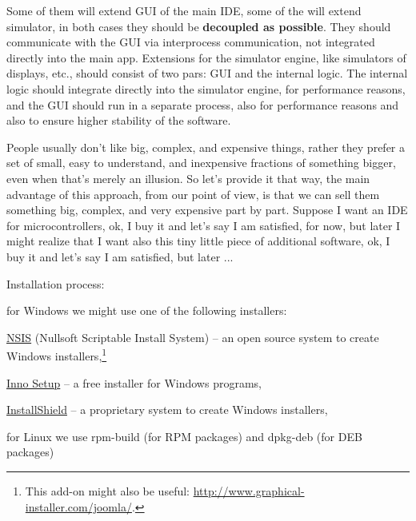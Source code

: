 \documentclass[a4paper,twoside,15pt]{book}
\begin{document}
\begin{dinglist}{73}
\begin{dinglist}{75}
						\item Some of them will extend GUI of the main IDE, some of the will extend simulator, in both cases they should be \textbf{decoupled as possible}. They should communicate with the GUI via interprocess communication, not integrated directly into the main app. Extensions for the simulator engine, like simulators of displays, etc., should consist of two pars: GUI and the internal logic. The internal logic should integrate directly into the simulator engine, for performance reasons, and the GUI should run in a separate process, also for performance reasons and also to ensure higher stability of the software.
						\item People usually don't like big, complex, and expensive things, rather they prefer a set of small, easy to understand, and inexpensive fractions of something bigger, even when that's merely an illusion. So let's provide it that way, the main advantage of this approach, from our point of view, is that we can sell them something big, complex, and very expensive part by part. Suppose I want an IDE for microcontrollers, ok, I buy it and let's say I am satisfied, for now, but later I might realize that I want also this tiny little piece of additional software, ok, I buy it and let's say I am satisfied, but later ...
					\end{dinglist}
				\item Installation process:
					\begin{dinglist}{75}
						\item for Windows we might use one of the following installers:
							\begin{dinglist}{72}
								\item \href{http://nsis.sourceforge.net/Main_Page}{NSIS} (Nullsoft Scriptable Install System) -- an open source system to create Windows installers,\footnote{This add-on might also be useful: \url{http://www.graphical-installer.com/joomla/}.}
								\item \href{http://www.jrsoftware.org/isinfo.php}{Inno Setup} -- a free installer for Windows programs,
								\item \href{http://www.flexerasoftware.com/products/installshield.htm}{InstallShield} -- a proprietary system to create Windows installers,
							\end{dinglist}
						\item for Linux we use rpm-build (for RPM packages) and dpkg-deb (for DEB packages)
					\end{dinglist}
			\end{dinglist}
\end{document}

